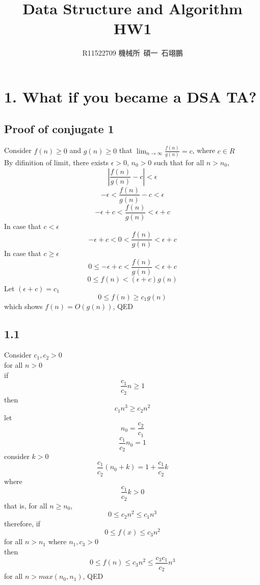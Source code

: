 \documentclass[12pt]{article}
\title{Data Structure and Algorithm HW1}
\author{R11522709 機械所\, 碩一\, 石翊鵬}
\begin{document}
\maketitle
\section*{1. What if you became a DSA TA?}
\subsection*{Proof of conjugate 1}
Consider $f(n)\geq 0$ and $g(n) \geq 0$ that $\lim_{n \to \infty} {\frac{f(n)}{g(n)}} = c$, where $c \in R$\\
By difinition of limit, there exists $\epsilon > 0$, $n_0 > 0$ such that for all $n > n_0$, \\
\[|\frac{f(n)}{g(n)}-c|<\epsilon\]
\[-\epsilon < \frac{f(n)}{g(n)} -c < \epsilon\]
\[-\epsilon + c < \frac{f(n)}{g(n)} < \epsilon + c \]
In case that $c < \epsilon$
\[-\epsilon + c < 0 < \frac{f(n)}{g(n)} < \epsilon + c \]
In case that $c \geq \epsilon$
\[0 \leq -\epsilon + c < \frac{f(n)}{g(n)} < \epsilon + c \]
\[0 \leq f(n) < (\epsilon + c)g(n)\]
Let $(\epsilon + c) = c_1$
\[0 \leq f(n) \geq c_1g(n)\]
which shows $f(n) = O(g(n))$, QED
\subsection*{1.1}
Consider $c_1, c_2 >0$\\
for all $n > 0$\\
if
\[\frac{c_1}{c_2}n \geq 1\]
then
\[c_1n^3\geq c_2n^2\]
let
\[n_0 = \frac{c_2}{c_1}\]
\[\frac{c_1}{c_2}n_0 = 1\]
consider $k > 0$
\[\frac{c_1}{c_2}(n_0+k) = 1+\frac{c_1}{c_2}k\]
where
\[\frac{c_1}{c_2}k > 0\]
that is, for all $n \geq n_0$,
\[0\leq c_2n^2 \leq c_1n^3\]
therefore, if
\[0 \leq f(x) \leq c_3n^2\]
for all $n > n_1$ where $n_1, c_3 > 0$\\
then
\[0 \leq f(n) \leq c_3n^2 \leq \frac{c_3c_1}{c_2}n^3\]
for all $n > max(n_0, n_1)$, QED
\end{document}
